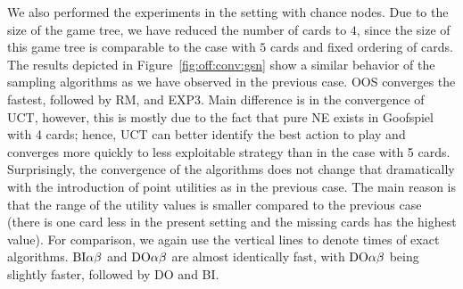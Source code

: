 {We also performed the experiments in the setting with chance nodes.
Due to the size of the game tree, we have reduced the number of cards to $4$, since the size of this game tree is comparable to the case with $5$ cards and fixed ordering of cards.
The results depicted in Figure~\ref{fig:off:conv:gsn} show a similar behavior of the sampling algorithms as we have observed in the previous case.
OOS converges the fastest, followed by RM, and EXP3.
Main difference is in the convergence of UCT, however, this is mostly due to the fact that pure NE exists in Goofspiel with 4 cards; hence, UCT can better identify the best action to play and converges more quickly to less exploitable strategy than in the case with 5 cards.
Surprisingly, the convergence of the algorithms does not change that dramatically with the introduction of point utilities as in the previous case.
The main reason is that the range of the utility values is smaller compared to the previous case (there is one card less in the present setting and the missing cards has the highest value).
For comparison, we again use the vertical lines to denote times of exact algorithms.
$\textrm{BI}\alpha\beta$ and $\textrm{DO}\alpha\beta$ are almost identically fast, with $\textrm{DO}\alpha\beta$ being slightly faster, followed by \textsc{DO} and \textsc{BI}.
}


